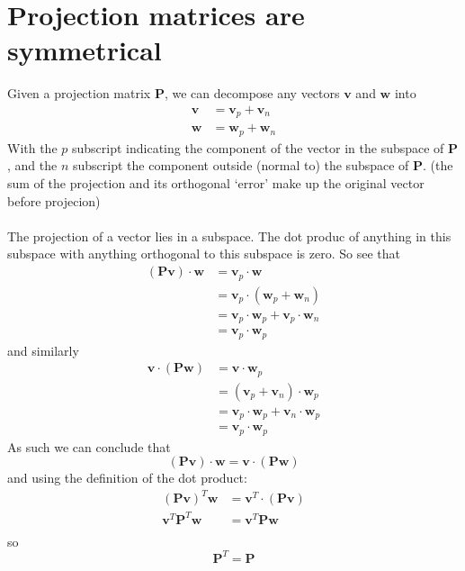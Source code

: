 \documentclass{report}
\begin{document}
\section{Projection matrices are symmetrical}
Given a projection matrix $\bm P$, we can decompose any vectors $\bm v$ and $\bm w$ into 
\begin{align*}
\bm v&=\bm v_p+\bm v_n\\
\bm w&=\bm w_p+\bm w_n
\end{align*}
With the $p$ subscript indicating the component of the vector in the subspace of $\bm P$, and the $n$ subscript the component outside (normal to) the subspace of $\bm P$.
(the sum of the projection and its orthogonal `error' make up the original vector before projecion)\\
\vspace{1mm}\\
The projection of a vector lies in a subspace. The dot produc of anything in this subspace with anything orthogonal to this subspace is zero. So see that
\begin{align*}
(\bm{Pv})\cdot\bm w&=\bm v_p\cdot\bm w\\
&=\bm v_p\cdot(\bm w_p+\bm w_n)\\
&=\bm v_p\cdot\bm w_p+\bm v_p\cdot\bm w_n\\
&=\bm v_p\cdot\bm w_p
\end{align*}
and similarly
\begin{align*}
\bm v\cdot(\bm{Pw})&=\bm v\cdot\bm w_p\\
&=(\bm v_p+\bm v_n)\cdot\bm w_p\\
&=\bm v_p\cdot\bm w_p+\bm v_n\cdot\bm w_p\\
&=\bm v_p\cdot\bm w_p
\end{align*}
As such we can conclude that
\begin{equation*}
(\bm{Pv})\cdot\bm w=\bm v\cdot(\bm{Pw})
\end{equation*}
and using the definition of the dot product:
\begin{align*}
(\bm{Pv})^T\bm w&=\bm v^T\cdot(\bm{Pv})\\
\bm v^T\bm P^T\bm w&=\bm v^T\bm P\bm w\\
\end{align*}
so
\begin{equation*}
\bm P^T=\bm P
\end{equation*}
\newpage
\end{document}
